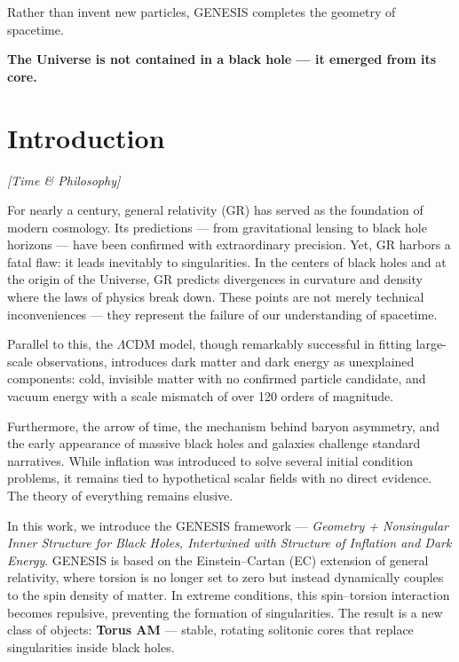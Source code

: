 \documentclass{article}
\newcommand{\timetag}{\textcolor{orange!80!black}{\textit{[Time \& Philosophy]}}}
\begin{document}
Rather than invent new particles, GENESIS completes the geometry of spacetime. \par 

\textbf{The Universe is not contained in a black hole — it emerged from its core.}




   


\clearpage



\tableofcontents
\thispagestyle{empty}
\clearpage









\section{Introduction}
\timetag

For nearly a century, general relativity (GR) has served as the foundation of modern cosmology. Its predictions — from gravitational lensing to black hole horizons — have been confirmed with extraordinary precision. Yet, GR harbors a fatal flaw: it leads inevitably to singularities. In the centers of black holes and at the origin of the Universe, GR predicts divergences in curvature and density where the laws of physics break down. These points are not merely technical inconveniences — they represent the failure of our understanding of spacetime.

Parallel to this, the $\Lambda$CDM model, though remarkably successful in fitting large-scale observations, introduces dark matter and dark energy as unexplained components: cold, invisible matter with no confirmed particle candidate, and vacuum energy with a scale mismatch of over 120 orders of magnitude.

Furthermore, the arrow of time, the mechanism behind baryon asymmetry, and the early appearance of massive black holes and galaxies challenge standard narratives. While inflation was introduced to solve several initial condition problems, it remains tied to hypothetical scalar fields with no direct evidence. The theory of everything remains elusive.

\vspace{1ex}

In this work, we introduce the GENESIS framework — \emph{Geometry + Nonsingular Inner Structure for Black Holes, Intertwined with Structure of Inflation and Dark Energy}. GENESIS is based on the Einstein–Cartan (EC) extension of general relativity, where torsion is no longer set to zero but instead dynamically couples to the spin density of matter. In extreme conditions, this spin–torsion interaction becomes repulsive, preventing the formation of singularities. The result is a new class of objects: \textbf{Torus AM} — stable, rotating solitonic cores that replace singularities inside black holes.
\end{document}
